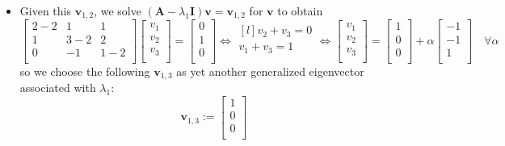 \documentclass[12pt,a4paper]{article}
\begin{document}
\begin{itemize}
\begin{itemize}
  \item Given this $\bm{v}_{1,2}$, we solve $(\bm{A}-\lambda_{1}\bm{I})\bm{v} = \bm{v}_{1,2}$ for $\bm{v}$ to obtain
    \begin{equation}\nonumber%
      \begin{bmatrix}
        2-2 & 1 & 1 \\
        1 & 3-2 & 2 \\
        0 & -1 & 1-2 \\
      \end{bmatrix}
      \begin{bmatrix}
        v_{1} \\
        v_{2} \\
        v_{3} \\
      \end{bmatrix}
      = 
      \begin{bmatrix}
        0 \\
        1 \\
        0 \\
      \end{bmatrix}
      \iff
      \begin{matrix*}[l]
        v_{2} + v_{3} = 0 \\
        v_{1} + v_{3} = 1 \\
      \end{matrix*}
      \iff
      \begin{bmatrix}
        v_{1} \\
        v_{2} \\
        v_{3} \\
      \end{bmatrix}
      =
      \begin{bmatrix}
        1 \\
        0 \\
        0 \\
      \end{bmatrix}
      +
      \alpha
      \begin{bmatrix}
        -1 \\
        -1 \\
        1 \\
      \end{bmatrix}
      \quad \forall \alpha
    \end{equation}
    so we choose the following $\bm{v}_{1,3}$ as yet another generalized eigenvector associated with $\lambda_{1}$:
    \begin{equation}\nonumber%
      \bm{v}_{1,3} :=
      \begin{bmatrix}
        1 \\
        0 \\
        0 \\
      \end{bmatrix}
    \end{equation}
    

\end{itemize}
\end{itemize}
\end{document}
